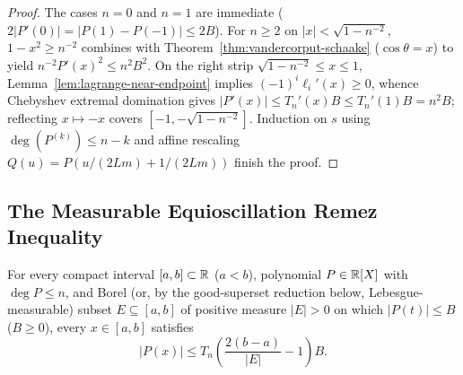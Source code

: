 \begin{proof}
The cases $n = 0$ and $n = 1$ are immediate ($2|P'(0)| = |P(1) - P(-1)| \le 2B$). For $n \ge 2$ on $|x| < \sqrt{1 - n^{-2}}$, $1 - x^2 \ge n^{-2}$ combines with Theorem~\ref{thm:vandercorput-schaake} ($\cos\theta = x$) to yield $n^{-2} P'(x)^2 \le n^2 B^2$. On the right strip $\sqrt{1 - n^{-2}} \le x \le 1$, Lemma~\ref{lem:lagrange-near-endpoint} implies $(-1)^i \ell_i'(x) \ge 0$, whence Chebyshev extremal domination gives $|P'(x)| \le T_n'(x) B \le T_n'(1) B = n^2 B$; reflecting $x \mapsto -x$ covers $[-1, -\sqrt{1 - n^{-2}}]$. Induction on $s$ using $\deg(P^{(k)}) \le n - k$ and affine rescaling $Q(u) = P(u/(2Lm) + 1/(2Lm))$ finish the proof.
\end{proof}

\subsection{The Measurable Equioscillation Remez Inequality}

\begin{theorem}
\label{thm:remez-inequality}
\leanok
For every compact interval $[a, b] \subset \mathbb{R}$ ($a < b$), polynomial $P \in \mathbb{R}[X]$ with $\deg P \le n$, and Borel (or, by the good-superset reduction below, Lebesgue-measurable) subset $E \subseteq [a, b]$ of positive measure $|E| > 0$ on which $|P(t)| \le B$ ($B \ge 0$), every $x \in [a, b]$ satisfies
\[
|P(x)| \le T_n\!\left(\frac{2(b - a)}{|E|} - 1\right) B.
\]
\end{theorem}

